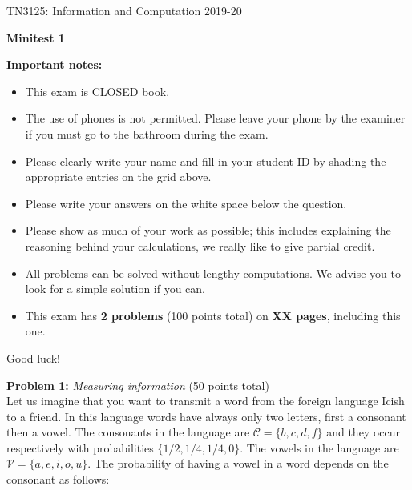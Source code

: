 \documentclass[11pt,a4paper,twoside]{article}
\begin{document}
\vspace*{-3cm}
TN3125: Information and Computation 2019-20 \\

\vspace{8cm}

\noindent \begin{center}
\textbf{{\Large Minitest 1}}\\
\par\end{center}

\vspace*{1cm}

\noindent \textbf{Important notes:}

\begin{itemize}
\item This exam is CLOSED book.
\item The use of phones is not permitted. Please leave your phone by the examiner if you must go to the bathroom during the exam.
\item Please clearly write your name and fill in your student ID by shading the appropriate entries on the grid above.
\item Please write your answers on the white space below the question. 
\item Please show as much of your work as possible; this includes explaining the reasoning behind your calculations, we really like to give partial credit.
\item All problems can be solved without lengthy computations. We advise you to look for a simple solution if you can.
\item This exam has {\bf 2 problems} (100 points total) on {\bf XX pages}, including this one.
\end{itemize}
\vspace{2cm}
Good luck!



\newpage
\noindent \textbf{Problem 1:} \emph{Measuring information} (50 points total)\\
Let us imagine that you want to transmit a word from the foreign language Icish to a friend. 
In this language words have always only two letters, first a consonant then a vowel. 
The consonants in the language are $\mathcal C=\{b,c,d,f\}$ and they occur respectively with probabilities $\{1/2,1/4,1/4,0\}$. 
The vowels in the language are $\mathcal V=\{a,e,i,o,u\}$. The probability of having a vowel in a word depends on the consonant as follows:
\end{document}
